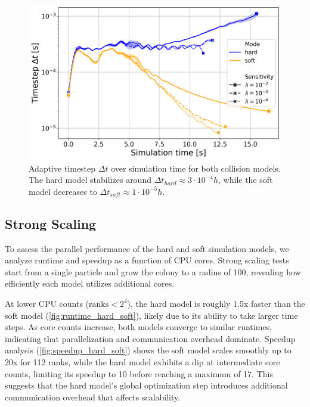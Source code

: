 \documentclass[conference]{IEEEtran}
\begin{document}
\begin{figure}[H]
    \centering
    \includegraphics[width=\linewidth]{figures/comparison_plots/combined_simulation_time [s]_vs_dt.png}
    \caption{Adaptive timestep $\Delta t$ over simulation time for both collision models. The hard model stabilizes around ${\Delta t}_{hard} \approx 3 \cdot 10^{-4} h$, while the soft model decreases to ${\Delta t}_{soft} \approx 1 \cdot 10^{-5} h$.} \label{fig:simulation_time_vs_dt}
\end{figure}


\subsection{Strong Scaling}

To assess the parallel performance of the hard and soft simulation models, we analyze runtime and speedup as a function of CPU cores. Strong scaling tests start from a single particle and grow the colony to a radius of 100, revealing how efficiently each model utilizes additional cores.

At lower CPU counts ($\text{ranks}< 2^4$), the hard model is roughly 1.5x faster than the soft model (\autoref{fig:runtime_hard_soft}), likely due to its ability to take larger time steps. As core counts increase, both models converge to similar runtimes, indicating that parallelization and communication overhead dominate. Speedup analysis (\autoref{fig:speedup_hard_soft}) shows the soft model scales smoothly up to 20x for 112 ranks, while the hard model exhibits a dip at intermediate core counts, limiting its speedup to 10 before reaching a maximum of 17. This suggests that the hard model's global optimization step introduces additional communication overhead that affects scalability.
\end{document}
